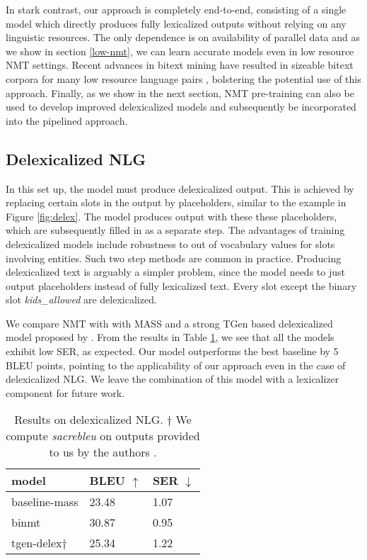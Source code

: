 \documentclass[11pt,a4paper]{article}
\begin{document}
In stark contrast, our approach is completely end-to-end, consisting of a single model which directly produces fully lexicalized outputs without relying on any linguistic resources. The only dependence is on availability of parallel data and as we show in section \ref{low-nmt}, we can learn accurate models even in low resource NMT settings. Recent advances in bitext mining have resulted in sizeable bitext corpora for many low resource language pairs \citep{schwenk2019ccmatrix, schwenk2019wikimatrix}, bolstering the potential use of this approach. Finally, as we show in the next section, NMT pre-training can also be used to develop improved delexicalized models and subsequently be incorporated into the pipelined approach.


\subsection{Delexicalized NLG} \label{delex-nlg}
In this set up, the model must produce delexicalized output. This is achieved by replacing certain slots in the output by placeholders, similar to the example in Figure \ref{fig:delex}. The model produces output with these these placeholders, which are subsequently filled in as a separate step. The advantages of training delexicalized models include robustness to out of vocabulary values for slots involving  entities. Such two step methods are common in practice. Producing delexicalized text is arguably a simpler problem, since the model needs to just output placeholders instead of fully lexicalized text. Every slot except the binary slot \textsl{kids\_allowed} are delexicalized. \par
We compare NMT with with MASS and a strong TGen based delexicalized model proposed by \citet{duvsek2019neural}. From the results in Table \ref{results-delex}, we see that all the models exhibit low SER, as expected. Our model outperforms the best baseline by 5 BLEU points, pointing to the applicability of our approach even in the case of delexicalized NLG. We leave the combination of this model with a lexicalizer component for future work.

\begin{table}[]
\centering
\begin{tabular}{l|ll} 
\hline
model    & BLEU $\uparrow$  & SER $\downarrow$   \\ \hline
baseline-mass    & 23.48 & 1.07  \\ 
binmt            & 30.87 & 0.95  \\ 
tgen-delex$\dagger$   & 25.34 & 1.22  \\ \hline
\end{tabular}
\caption{Results on delexicalized NLG. \newline
$\dagger$ We compute \textsl{sacrebleu} on outputs provided to us by the authors \citep{duvsek2019neural}.}
\label{results-delex}
\end{table}
\end{document}
